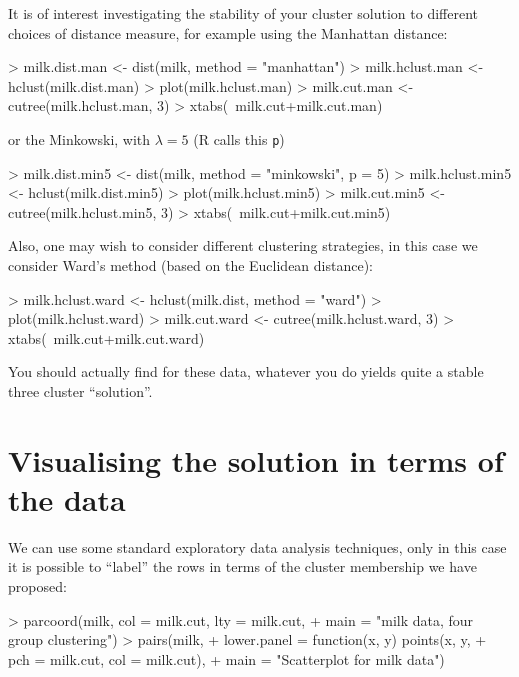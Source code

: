 \documentclass[11pt]{article}
\begin{document}
It is of interest investigating the stability of your cluster solution to different choices of distance measure, for example using the Manhattan distance:

\begin{Schunk}
\begin{Sinput}
> milk.dist.man <- dist(milk, method = "manhattan")
> milk.hclust.man <- hclust(milk.dist.man)
> plot(milk.hclust.man)
> milk.cut.man <- cutree(milk.hclust.man, 3)
> xtabs(~milk.cut+milk.cut.man)
\end{Sinput}
\end{Schunk}

or the Minkowski, with $\lambda=5$ (R calls this \texttt{p})

\begin{Schunk}
\begin{Sinput}
> milk.dist.min5 <- dist(milk, method = "minkowski", p = 5)
> milk.hclust.min5 <- hclust(milk.dist.min5)
> plot(milk.hclust.min5)
> milk.cut.min5 <- cutree(milk.hclust.min5, 3)
> xtabs(~milk.cut+milk.cut.min5)
\end{Sinput}
\end{Schunk}


Also, one may wish to consider different clustering strategies, in this case we consider Ward's method (based on the Euclidean distance):

\begin{Schunk}
\begin{Sinput}
> milk.hclust.ward <- hclust(milk.dist, method = "ward")
> plot(milk.hclust.ward)
> milk.cut.ward <- cutree(milk.hclust.ward, 3)
> xtabs(~milk.cut+milk.cut.ward)
\end{Sinput}
\end{Schunk}


You should actually find for these data, whatever you do yields quite a stable three cluster ``solution''.


\section{Visualising the solution in terms of the data}

We can use some standard exploratory data analysis techniques, only in this case it is possible to ``label'' the rows in terms of the cluster membership we have proposed:

\begin{Schunk}
\begin{Sinput}
> parcoord(milk, col = milk.cut, lty = milk.cut, 
+   main = "milk data, four group clustering")
> pairs(milk,
+          lower.panel = function(x, y){ points(x, y,
+          pch = milk.cut, col = milk.cut)},
+          main = "Scatterplot for milk data")
\end{Sinput}
\end{Schunk}
\end{document}
